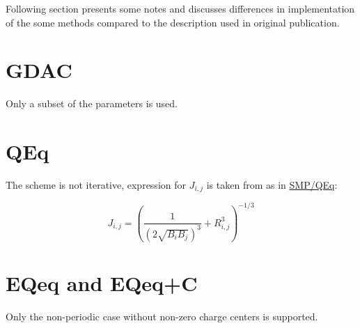 \documentclass[oneside]{memoir}
\newcommand\ddfrac[2]{\frac{\displaystyle #1}{\displaystyle #2}}
\begin{document}
Following section presents some notes and discusses differences in implementation of the some methods compared to the description used in original publication.

\section*{GDAC}
Only a subset of the parameters is used.

\section*{QEq}
The scheme is not iterative, expression for $J_{i,j}$ is taken from \cite{Louwen1998} as in \hyperref[sec:methods_smpqeq]{SMP/QEq}:

\begin{equation}
\label{eq:qeq_louwen}
J_{i, j} = \left(\ddfrac{1}{(2\sqrt{B_iB_j})^3} + R_{i,j}^3\right)^{-1/3}
\end{equation}

\section*{EQeq and EQeq+C}
Only the non-periodic case without non-zero charge centers is supported.

\printbibliography
\end{document}
